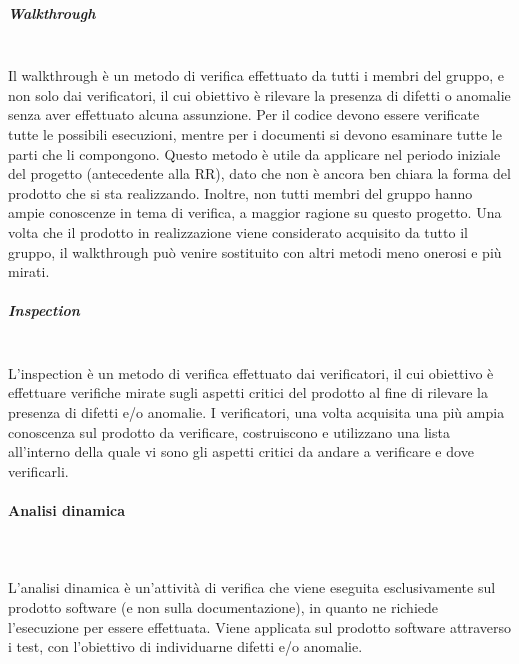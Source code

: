 \subparagraph*{Walkthrough} \mbox{}\\
Il walkthrough è un metodo di verifica effettuato da tutti i membri del gruppo, e non solo dai verificatori, il cui obiettivo è rilevare la presenza di difetti o anomalie senza aver effettuato alcuna assunzione.
Per il codice devono essere verificate tutte le possibili esecuzioni, mentre per i documenti si devono esaminare tutte le parti che li compongono.
Questo metodo è utile da applicare nel periodo iniziale del progetto (antecedente alla RR), dato che non è ancora ben chiara la forma del prodotto che si sta realizzando.
Inoltre, non tutti membri del gruppo hanno ampie conoscenze in tema di verifica, a maggior ragione su questo progetto. Una volta che il prodotto in realizzazione viene considerato acquisito da tutto il gruppo, il walkthrough può venire sostituito con altri metodi meno onerosi e più mirati.
\subparagraph*{Inspection} \mbox{}\\
L'inspection è un metodo di verifica effettuato dai verificatori, il cui obiettivo è effettuare verifiche mirate sugli aspetti critici del prodotto al fine di rilevare la presenza di difetti e/o anomalie.
I verificatori, una volta acquisita una più ampia conoscenza sul prodotto da verificare, costruiscono e utilizzano una lista all’interno della quale vi sono gli aspetti critici da andare a verificare e dove verificarli.

\paragraph{Analisi dinamica} \mbox{}\\ \\
L'analisi dinamica è un'attività di verifica che viene eseguita esclusivamente sul prodotto software (e non sulla documentazione), in quanto ne richiede l'esecuzione per essere effettuata.
Viene applicata sul prodotto software attraverso i test, con l’obiettivo di individuarne difetti e/o anomalie.

